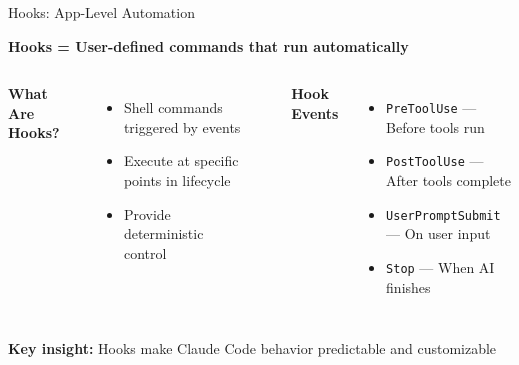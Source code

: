 \documentclass[aspectratio=169]{beamer}
\begin{document}
\begin{frame}{Hooks: App-Level Automation}

\vspace{0.5cm}
\centering
\Large
\textbf{Hooks = User-defined commands that run automatically}
\vspace{0.5cm}
\normalsize
\begin{columns}

\centering
\textbf{\large What Are Hooks?}

\begin{itemize}
\item Shell commands triggered by events
\item Execute at specific points in lifecycle
\item Provide deterministic control
\end{itemize}

\centering
\rule{1pt}{4cm}

\centering
\textbf{\large Hook Events}

\begin{itemize}
\item \texttt{PreToolUse} — Before tools run
\item \texttt{PostToolUse} — After tools complete
\item \texttt{UserPromptSubmit} — On user input
\item \texttt{Stop} — When AI finishes
\end{itemize}

\end{columns}
\vspace{0.5cm}
\centering
\large
\textbf{Key insight:} Hooks make Claude Code behavior predictable and customizable

\end{frame}
\end{document}
